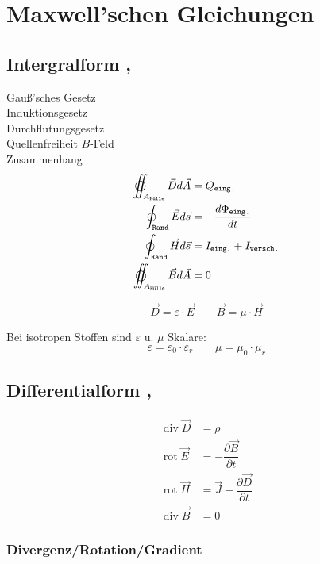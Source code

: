 \section{Maxwell’schen Gleichungen}

\subsection{Intergralform , }
Gauß'sches Gesetz\\
Induktionsgesetz\\
Durchflutungsgesetz\\
Quellenfreiheit $B$-Feld\\
Zusammenhang
\begin{align*}
    \varoiint_{A_\texttt{Hülle}} \vec{D} d \vec{A} & = Q_\texttt{eing.}                      \\
    \oint_\texttt{Rand} \vec{E} d \vec{s}          & = -\dfrac{d\Phi_\texttt{eing.}}{dt}     \\
    \oint_\texttt{Rand} \vec{H} d \vec{s}          & = I_\texttt{eing.} + I_\texttt{versch.} \\
    \varoiint_{A_\texttt{Hülle}} \vec{B} d \vec{A} & = 0
\end{align*}

\[
    \vec{D} = \varepsilon \cdot \vec{E} \qquad
    \vec{B} = \mu \cdot \vec{H}
\]

Bei isotropen Stoffen sind $\varepsilon$ u. $\mu$ Skalare:
\[
    \varepsilon = \varepsilon_0 \cdot \varepsilon_r \qquad \mu = \mu_0 \cdot \mu_r
\]

\subsection{Differentialform , }
\begin{align*}
    \operatorname{div} \vec{D} & = \rho                                           \\
    \operatorname{rot} \vec{E} & = -\dfrac{\partial \vec{B}}{\partial t}          \\
    \operatorname{rot} \vec{H} & = \vec{J} + \dfrac{\partial \vec{D}}{\partial t} \\
    \operatorname{div} \vec{B} & = 0
\end{align*}

\subsubsection*{Divergenz/Rotation/Gradient}

